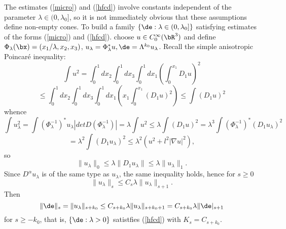 The estimates (\ref{micro}) and (\ref{hfcd}) involve constants independent of the parameter $\lambda \in (0,\lambda_0]$, so it is not immediately obvious that these assumptions define non-empty cones. To build a family $\{\de: \lambda \in (0,\lambda_0]\}$ satisfying estimates of the forms (\ref{micro}) and (\ref{hfcd}). choose $u \in C_0^{\infty}(\bR^3)$ and define $\Phi_{\lambda}(\bx)=(x_1/\lambda,x_2,x_3)$, $u_{\lambda} = \Phi_{\lambda}^*u, \de= \Lambda^{k_0}u_{\lambda}$. Recall the simple anisotropic Poincar\'{e} inequality:
\[
\int u^2 = \int_0^1dx_2 \int_0^1dx_3 \int_0^1dx_1\left(\int_0^{x_1} D_1u\right) ^2
\]
\[
\le \int_0^1dx_2 \int_0^1dx_3 \int_0^1dx_1\left(x_1\int_0^{x_1} (D_1u)^2\right)
\le \int (D_1u)^2
\]
whence
\[ 
\int u_\lambda^2 = \int (\Phi_{\lambda}^{-1})^*u_{\lambda} |det D(\Phi_{\lambda}^{-1})|
 = \lambda \int u^2 \le \lambda \int (D_1u)^2 = \lambda^3 \int (\Phi_{\lambda}^{-1})^*(D_1 u_{\lambda})^2 
\]
\[
= \lambda^2 \int (D_1 u_{\lambda})^2 \le \lambda^2 (u^2 + l^2|\nabla u|^2), 
\]
so
\[
\|u_{\lambda}\|_0 \le \lambda \|D_1 u_{\lambda}\| \le \lambda \|u_{\lambda}\|_1.
\]
Since $D^{\alpha}u_{\lambda}$ is of the same type as $u_{\lambda}$, the same inequality holds, hence for $s \ge 0$  
\[
\|u_{\lambda}\|_s \le C_s \lambda \|u_{\lambda}\|_{s+1}.
\]
Then
\[
\|\de\|_s = \|u_{\lambda}\|_{s+k_0} \le C_{s+k_0}\lambda\|u_{\lambda}\|_{s+k_0+1} = C_{s+k_0}\lambda\|\de|_{s+1}
\]
for $s \ge -k_0$, that is, $\{\de:\lambda > 0\}$ satistfies (\ref{hfcd}) with $K_s = C_{s+k_0}$.

